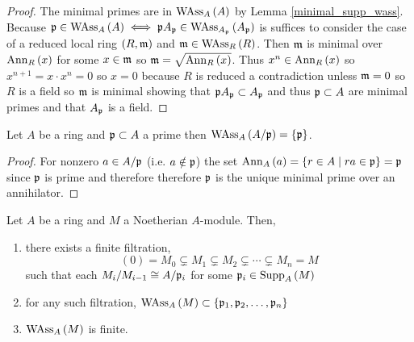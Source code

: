 \documentclass[12pt]{article}
\begin{document}
\begin{proof}
The minimal primes are in $\mathrm{WAss}_{A}\left(A \right)$ by Lemma \ref{minimal_supp_wass}. Because $\mathfrak{p} \in \mathrm{WAss}_{A}\left(A \right) \iff \mathfrak{p} A_{\mathfrak{p}} \in \mathrm{WAss}_{A_{\mathfrak{p}}}\left(A_{\mathfrak{p}} \right)$ is suffices to consider the case of a reduced local ring $(R, \mathfrak{m})$ and $\mathfrak{m} \in \mathrm{WAss}_{R}\left(R \right)$. Then $\mathfrak{m}$ is minimal over $\mathrm{Ann}_{R}\left(x\right)$ for some $x \in \mathfrak{m}$ so $\mathfrak{m} = \sqrt{\mathrm{Ann}_{R}\left(x\right)}$. Thus $x^n \in \mathrm{Ann}_{R}\left(x\right)$ so $x^{n+1} = x \cdot x^n = 0$ so $x = 0$ because $R$ is reduced a contradiction unless $\mathfrak{m} = 0$ so $R$ is a field so $\mathfrak{m}$ is minimal showing that $\mathfrak{p} A_{\mathfrak{p}} \subset A_{\mathfrak{p}}$ and thus $\mathfrak{p} \subset A$ are minimal primes and that $A_{\mathfrak{p}}$ is a field. 
\end{proof}

\begin{lemma}
Let $A$ be a ring and $\mathfrak{p} \subset A$ a prime then $\mathrm{WAss}_{A}\left(A / \mathfrak{p} \right) = \{ \mathfrak{p} \}$. 
\end{lemma}

\begin{proof}
For nonzero $a \in A / \mathfrak{p}$ (i.e. $a \notin \mathfrak{p}$) the set $\mathrm{Ann}_{A}\left(a\right) = \{ r \in A \mid ra \in \mathfrak{p} \} = \mathfrak{p}$ since $\mathfrak{p}$ is prime and therefore therefore $\mathfrak{p}$ is the unique minimal prime over an annihilator.
\end{proof}

\begin{proposition} \label{noetherian_finite_wass}
Let $A$ be a ring and $M$ a Noetherian $A$-module. Then,
\begin{enumerate}
\item there exists a finite filtration,
\[ (0) = M_0 \subsetneq M_1 \subsetneq M_2 \subsetneq \cdots \subsetneq M_n = M \]
such that each $M_{i} / M_{i-1} \cong A / \mathfrak{p}_{i}$ for some $\mathfrak{p}_i \in \mathrm{Supp}_{A} \left( M \right)$
\item for any such filtration, $\mathrm{WAss}_{A}\left(M \right) \subset \{ \mathfrak{p}_1, \mathfrak{p}_2, \dots, \mathfrak{p}_n\}$
\item $\mathrm{WAss}_{A}\left(M \right)$ is finite.
\end{enumerate}
\end{proposition}
\end{document}
